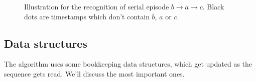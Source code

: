 \begin{figure}[t]

\caption{Illustration for the recognition of serial episode $ b \to a \to c $. Black dots are timestamps which don't contain $ b $, $ a $ or $ c $.}
\label{fig:serial-recognition}
\end{figure}

\subsection{Data structures}

The algorithm uses some bookkeeping data structures, which get updated as the sequence gets read. We'll discuss the most important ones.

